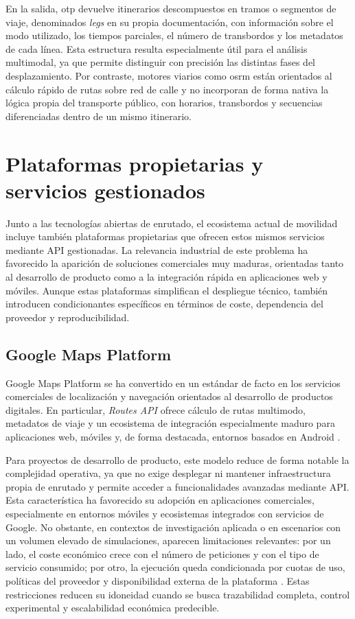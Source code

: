 En la salida, \gls{otp} devuelve itinerarios descompuestos en tramos o segmentos de viaje, denominados \textit{legs} en su propia documentación, con información sobre el modo utilizado, los tiempos parciales, el número de transbordos y los metadatos de cada línea. Esta estructura resulta especialmente útil para el análisis multimodal, ya que permite distinguir con precisión las distintas fases del desplazamiento. Por contraste, motores viarios como \gls{osrm} están orientados al cálculo rápido de rutas sobre red de calle y no incorporan de forma nativa la lógica propia del transporte público, con horarios, transbordos y secuencias diferenciadas dentro de un mismo itinerario.


\section{Plataformas propietarias y servicios gestionados}

Junto a las tecnologías abiertas de enrutado, el ecosistema actual de movilidad incluye también plataformas propietarias que ofrecen estos mismos servicios mediante API gestionadas. La relevancia industrial de este problema ha favorecido la aparición de soluciones comerciales muy maduras, orientadas tanto al desarrollo de producto como a la integración rápida en aplicaciones web y móviles. Aunque estas plataformas simplifican el despliegue técnico, también introducen condicionantes específicos en términos de coste, dependencia del proveedor y reproducibilidad.

\subsection{Google Maps Platform}

Google Maps Platform se ha convertido en un estándar de facto en los servicios comerciales de localización y navegación orientados al desarrollo de productos digitales. En particular, \textit{Routes API} ofrece cálculo de rutas multimodo, metadatos de viaje y un ecosistema de integración especialmente maduro para aplicaciones web, móviles y, de forma destacada, entornos basados en Android \cite{GoogleRoutesAPI}.\newline

Para proyectos de desarrollo de producto, este modelo reduce de forma notable la complejidad operativa, ya que no exige desplegar ni mantener infraestructura propia de enrutado y permite acceder a funcionalidades avanzadas mediante API. Esta característica ha favorecido su adopción en aplicaciones comerciales, especialmente en entornos móviles y ecosistemas integrados con servicios de Google. No obstante, en contextos de investigación aplicada o en escenarios con un volumen elevado de simulaciones, aparecen limitaciones relevantes: por un lado, el coste económico crece con el número de peticiones y con el tipo de servicio consumido; por otro, la ejecución queda condicionada por cuotas de uso, políticas del proveedor y disponibilidad externa de la plataforma \cite{GoogleMapsPricing}. Estas restricciones reducen su idoneidad cuando se busca trazabilidad completa, control experimental y escalabilidad económica predecible.

